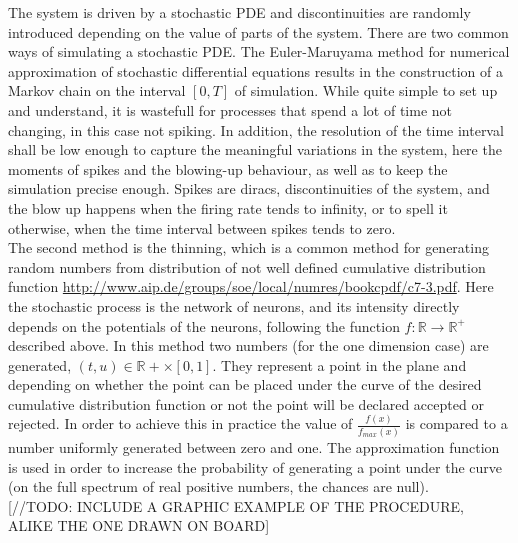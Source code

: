 	The system is driven by a stochastic PDE and discontinuities are randomly introduced depending on the value of parts of the system. There are two common ways of simulating a stochastic PDE. The Euler-Maruyama method for numerical approximation of stochastic differential equations results in the construction of a Markov chain on the interval $[0,T]$ of simulation. While quite simple to set up and understand, it is wastefull for processes that spend a lot of time not changing, in this case not spiking. In addition, the resolution of the time interval shall be low enough to capture the meaningful variations in the system, here the moments of spikes and the blowing-up behaviour, as well as to keep the simulation precise enough. Spikes are diracs, discontinuities of the system, and the blow up happens when the firing rate tends to infinity, or to spell it otherwise, when the time interval between spikes tends to zero.\\
	The second method is the thinning, which is a common method for generating random numbers from distribution of not well defined cumulative distribution function \url{http://www.aip.de/groups/soe/local/numres/bookcpdf/c7-3.pdf}. Here the stochastic process is the network of neurons, and its intensity directly depends on the potentials of the neurons, following the function $f:\mathbb{R}\rightarrow\mathbb{R}^+$ described above. In this method two numbers (for the one dimension case) are generated, $(t,u)\in\mathbb{R}+\times[0,1]$. They represent a point in the plane and depending on whether the point can be placed under the curve of the desired cumulative distribution function or not the point will be declared accepted or rejected. In order to achieve this in practice the value of $\frac{f(x)}{f_{max}(x)}$ is compared to a number uniformly generated between zero and one. The approximation function is used in order to increase the probability of generating a point under the curve (on the full spectrum of real positive numbers, the chances are null).\\

	[//TODO: INCLUDE A GRAPHIC EXAMPLE OF THE PROCEDURE, ALIKE THE ONE DRAWN ON BOARD]\\

